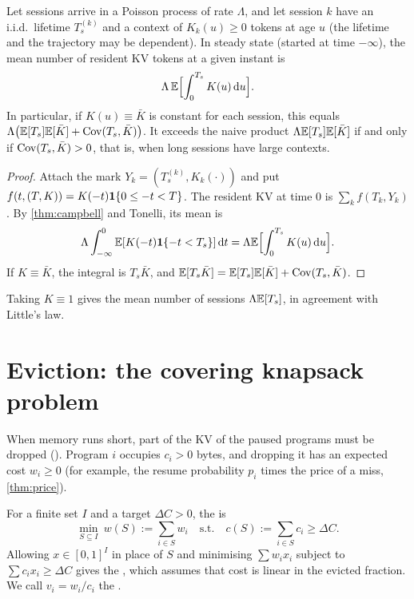 \begin{corollary}\label{cor:resident-kv}
Let sessions arrive in a Poisson process of rate $\Lambda$, and let session $k$
have an i.i.d.\ lifetime $T_s^{(k)}$ and a context of $K_k(u)\ge0$ tokens at age $u$ (the
lifetime and the trajectory may be dependent). In steady state (started at time
$-\infty$), the mean number of resident KV tokens at a given instant is
\[
  \Lambda\,\mathbb{E}\Bigl[\int_0^{T_s}K(u)\,\mathrm{d} u\Bigr].
\]
In particular, if $K(u)\equiv\bar K$ is constant for each session, this equals
$\Lambda\bigl(\mathbb{E}[T_s]\mathbb{E}[\bar K]+\operatorname{Cov}(T_s,\bar K)\bigr)$. It exceeds the naive
product $\Lambda\mathbb{E}[T_s]\mathbb{E}[\bar K]$ if and only if $\operatorname{Cov}(T_s,\bar K)>0$, that is,
when long sessions have large contexts.
\end{corollary}

\begin{proof}
Attach the mark $Y_k=(T_s^{(k)},K_k(\cdot))$ and put
$f(t,(T,K))=K(-t)\mathbf{1}\{0\le -t<T\}$. The resident KV at time $0$ is
$\sum_kf(T_k,Y_k)$. By \cref{thm:campbell} and Tonelli, its mean is
\[
  \Lambda\int_{-\infty}^0\mathbb{E}[K(-t)\mathbf{1}\{-t<T_s\}]\,\mathrm{d} t=\Lambda\mathbb{E}\Bigl[\int_0^{T_s}K(u)\,\mathrm{d} u\Bigr].
\]
If $K\equiv\bar K$, the integral is $T_s\bar K$, and
$\mathbb{E}[T_s\bar K]=\mathbb{E}[T_s]\mathbb{E}[\bar K]+\operatorname{Cov}(T_s,\bar K)$.
\end{proof}

Taking $K\equiv1$ gives the mean number of sessions $\Lambda\mathbb{E}[T_s]$, in agreement
with Little's law.

\section{Eviction: the covering knapsack problem}\label{L4:sec:knapsack}

When memory runs short, part of the KV of the paused programs must be dropped
(). Program $i$ occupies $c_i>0$ bytes, and dropping it has an
expected cost $w_i\ge0$ (for example, the resume probability $p_i$ times the price
of a miss, \cref{thm:price}).

\begin{definition}\label{L4:def:knapsack}
For a finite set $I$ and a target $\Delta C>0$, the  is
\[
  \min_{S\subseteq I}\ w(S):=\sum_{i\in S}w_i\quad\text{s.t.}\quad c(S):=\sum_{i\in S}c_i\ge\Delta C .
\]
Allowing $x\in[0,1]^I$ in place of $S$ and minimising $\sum w_ix_i$ subject to
$\sum c_ix_i\ge\Delta C$ gives the , which assumes that cost is
linear in the evicted fraction. We call $v_i=w_i/c_i$ the .
\end{definition}

